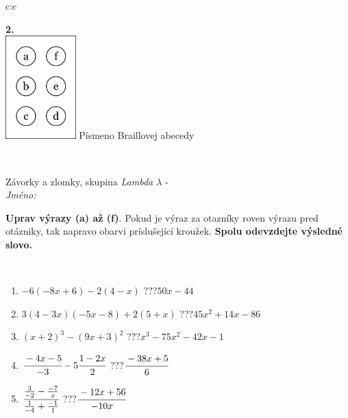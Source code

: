 \documentclass[10pt]{report}
\begin{document}
\begin{tabular}{c:c}
\begin{minipage}[c][104.5mm][t]{0.5\linewidth}
\begin{center}
\begin{minipage}{0.20\linewidth}
\begin{center}
{\Huge\bfseries 2.} \\[2mm]
\includegraphics[height=40mm]{../images/braille.png}
{\small Písmeno Braillovej abecedy}
\end{center}
\end{minipage}
\end{center}
\end{minipage}
\\ \hdashline
\begin{minipage}[c][104.5mm][t]{0.5\linewidth}
\begin{center}
\vspace{7mm}
{\huge Závorky a zlomky, skupina \textit{Lambda $\lambda$} -}\\[5mm]
\textit{Jméno:}\phantom{xxxxxxxxxxxxxxxxxxxxxxxxxxxxxxxxxxxxxxxxxxxxxxxxxxxxxxxxxxxxxxxxx}\\[5mm]
\begin{minipage}{0.95\linewidth}
\begin{center}
\textbf{Uprav výrazy (a) až (f)}. Pokud je výraz za otazníky roven výrazu pred otázniky, tak napravo obarvi príslušející kroužek. \textbf{Spolu odevzdejte výsledné slovo.}
\end{center}
\end{minipage}
\\[1mm]
\begin{minipage}{0.79\linewidth}
\begin{center}
\begin{varwidth}{\linewidth}
\begin{enumerate}
\normalsize
\item $-6(-8x+6)-2(4-x)$\quad \dotfill\; ???\;\dotfill \quad $50x-44$
\item $3(4-3x)(-5x-8)+2(5+x)$\quad \dotfill\; ???\;\dotfill \quad $45x^2+14x-86$
\item $(x+2)^3-(9x+3)^2$\quad \dotfill\; ???\;\dotfill \quad $x^3-75x^2-42x-1$
\item $\cfrac{-4x-5}{-3}-5\cfrac{1-2x}{2}$\quad \dotfill\; ???\;\dotfill \quad $\cfrac{-38x+5}{6}$
\item $\cfrac{\frac{3}{-2}-\frac{-7}{x}}{\frac{1}{-4}+\frac{-1}{1}}$\quad \dotfill\; ???\;\dotfill \quad $\cfrac{-12x+56}{-10x}$

\end{enumerate}
\end{varwidth}
\end{center}
\end{minipage}
\end{center}
\end{minipage}
\end{tabular}
\end{document}
